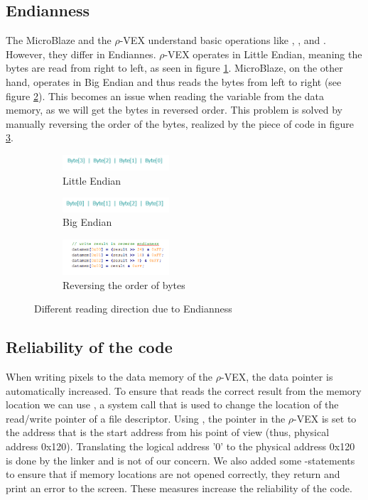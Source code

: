 \subsection{Endianness}
\label{sec:endian}
The MicroBlaze and the $\rho$-VEX understand basic operations like , ,  and . However, they differ in Endiannes. $\rho$-VEX operates in Little Endian, meaning the bytes are read from right to left, as seen in figure \ref{fig:little}. MicroBlaze, on the other hand, operates in Big Endian and thus reads the bytes from left to right (see figure \ref{fig:big}). This becomes an issue when reading the  variable from the data memory, as we will get the bytes in reversed order. This problem is solved by manually reversing the order of the  bytes, realized by the piece of code in figure \ref{fig:swap}.

\begin{figure}[htb]
	\centering
	\begin{subfigure} [h] {0.5\textwidth}
		\centering
		\includegraphics[width=150px]{Pictures/little}
		\caption{Little Endian}
		\label{fig:little}
	\end{subfigure}
	\quad
	\begin{subfigure} [h] {0.5\textwidth}
		\centering
		\includegraphics[width=150px]{Pictures/big}
		\caption{Big Endian}
		\label{fig:big}
	\end{subfigure}
	\quad
	\begin{subfigure} [h] {0.5\textwidth}
		\centering
		\includegraphics[width=150px]{Pictures/byteswap}
		\caption{Reversing the order of bytes}
		\label{fig:swap}
	\end{subfigure}
\caption{Different reading direction due to Endianness}%
\label{}%
\end{figure}

\subsection{Reliability of the code}
\label{sec:reliable}
When writing pixels to the data memory of the $\rho$-VEX, the data pointer is automatically increased. To ensure that  reads the correct result from the memory location we can use , a system call that is used to change the location of the read/write pointer of a file descriptor. Using , the pointer in the $\rho$-VEX is set to the address that is the start address from his point of view (thus, physical address 0x120). Translating the logical address '0' to the physical address 0x120 is done by the linker and is not of our concern. We also added some -statements to ensure that if memory locations are not opened correctly, they return  and print an error to the screen. These measures increase the reliability of the code. 
